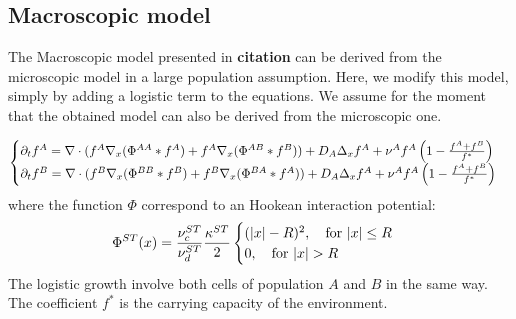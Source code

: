 	\subsection{Macroscopic model}
	The Macroscopic model presented in \textbf{citation} can be derived from the microscopic model in a large population assumption. Here, we modify this model, simply by adding a logistic term to the equations. We assume for the moment that the obtained model can also be derived from the microscopic one.
	
	\begin{equation}\label{MacroModel}
		\begin{cases}
	{\partial}_t f^{A}=  \nabla \cdot (f^A\nabla_x(\Phi^{AA}* f^A) + f^A \nabla_x( \Phi^{AB}*f^B)) + D_A \Delta_x f^A + \nu^{A}f^A\left( 1-\frac{f^A+f^B}{f^{*}} \right) \\
	
	{\partial}_t f^{B}=  \nabla \cdot (f^B\nabla_x(\Phi^{BB}* f^B) + f^B \nabla_x (\Phi^{BA}*f^A)) + D_A \Delta_x f^A + \nu^{A}f^A\left( 1-\frac{f^A+f^B}{f^{*}} \right)
		\end{cases}
	\end{equation}
	where the function $\Phi$ correspond to an Hookean interaction potential:
	\begin{equation}
	\Phi^{ST}(x)=\frac{\nucST}{\nudST}\frac{\KST}{2}
	 \begin{cases}
	  (|x|-R)^2, \quad \text{for } |x|\leq R\\
	  0, \quad \text{for } |x|> R
	 \end{cases}
	\end{equation}
	The logistic growth involve both cells of population $A$ and $B$ in the same way. The coefficient $f^*$ is the carrying capacity of the environment.
